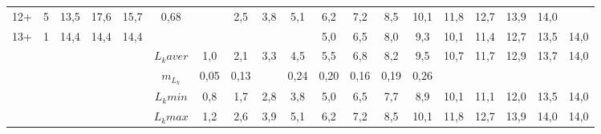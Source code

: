 \begin{landscape}
\begin{table}[h]
\begin{tabular}{|c|c|cc|cc|ccccccccccccc|}
12+     & 5  & 13,5  & 17,6  & 15,7    & 0,68    &      & 2,5  & 3,8 & 5,1  & 6,2  & 7,2  & 8,5  & 10,1 & 11,8 & 12,7 & 13,9 & 14,0 &      \\
13+     & 1  & 14,4  & 14,4  & 14,4    &         &      &      &     &      & 5,0  & 6,5  & 8,0  & 9,3  & 10,1 & 11,4 & 12,7 & 13,5 & 14,0 \\ \hline
        &    &       &       &         & $L_k aver$ & 1,0  & 2,1  & 3,3 & 4,5  & 5,5  & 6,8  & 8,2  & 9,5  & 10,7 & 11,7 & 12,9 & 13,7 & 14,0 \\
        &    &       &       &         & $m_{L_k}$  & 0,05 & 0,13 &     & 0,24 & 0,20 & 0,16 & 0,19 & 0,26 &      &      &      &      &      \\
        &    &       &       &         & $L_k min$  & 0,8  & 1,7  & 2,8 & 3,8  & 5,0  & 6,5  & 7,7  & 8,9  & 10,1 & 11,1 & 12,0 & 13,5 & 14,0 \\
        &    &       &       &         & $L_k max$  & 1,2  & 2,6  & 3,9 & 5,1  & 6,2  & 7,2  & 8,5  & 10,1 & 11,8 & 12,7 & 13,9 & 14,0 & 14,0 \\ \hline
\end{tabular}
\end{table}


\end{landscape}
